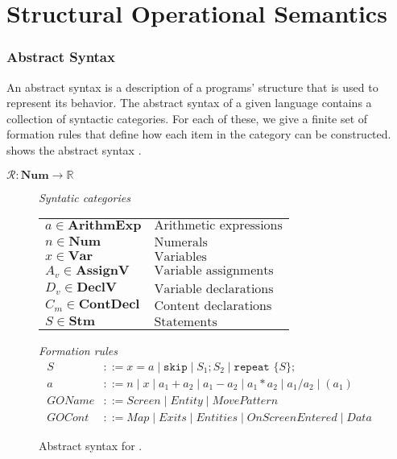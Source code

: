 \section{Structural Operational Semantics}

\subsubsection*{Abstract Syntax}
An abstract syntax is a description of a programs' structure that is used to represent its behavior. 
The abstract syntax of a given language contains a collection of syntactic categories. 
For each of these, we give a finite set of formation rules that define how each item in the category can be constructed.
 shows the abstract syntax \dazel{}.

$\mathcal{R}:\textbf{Num}\rightarrow \mathbb{R}$

\begin{figure}[htbp]
	\centering
	\textit{Syntatic categories}
	\vspace{4mm}


	\begin{tabular}{l l}
		$a \in \textbf{ArithmExp}$ & $\text{Arithmetic expressions}$ \\ 
		$n \in \textbf{Num}$ & $\text{Numerals}$ \\
		$x \in \textbf{Var}$ & $\text{Variables}$ \\
		$A_v \in \textbf{AssignV}$ & $\text{Variable assignments}$ \\
		$D_v \in \textbf{DeclV}$ & $\text{Variable declarations}$ \\
		$C_m \in \textbf{ContDecl}$ & $\text{Content declarations}$ \\
		$S \in \textbf{Stm}$ & $\text{Statements}$
	\end{tabular}

	\vspace{4mm}
	\textit{Formation rules}
	\begin{align*}
		S&::=x=a\mid \texttt{skip}\mid S_1;S_2\mid \texttt{repeat }\{S\}; \\
		a&::=n\mid x\mid a_1+a_2\mid a_1-a_2\mid a_1*a_2\mid a_1/a_2\mid (a_1) \\
		GOName&::= \textit{Screen} \mid \textit{Entity} \mid \textit{MovePattern} \\
		GOCont&::= \textit{Map} \mid \textit{Exits} \mid \textit{Entities} \mid \textit{OnScreenEntered} \mid \textit{Data}
	\end{align*}

	\caption{Abstract syntax for \dazel{}.}
	\label{fig:AbstractSyntax}
\end{figure}

